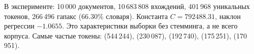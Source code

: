 В эксперименте: 10\,000 документов, 10\,683\,808 вхождений,
401\,968 уникальных токенов, 266\,496 гапакс
(66.30\% словаря).
Константа $C=792488.31$, наклон регрессии $-1.0655$.
Это характеристики выборки без стемминга, а не всего корпуса.
Самые частые токены:  (544\,244),  (230\,087),  (192\,740),  (175\,251),  (170\,951).
